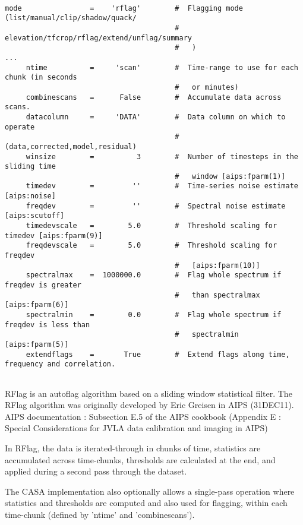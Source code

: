 \small
\begin{verbatim}

mode                =    'rflag'        #  Flagging mode (list/manual/clip/shadow/quack/
                                        #   elevation/tfcrop/rflag/extend/unflag/summary
                                        #   )
...
     ntime          =     'scan'        #  Time-range to use for each chunk (in seconds
                                        #   or minutes)
     combinescans   =      False        #  Accumulate data across scans.
     datacolumn     =     'DATA'        #  Data column on which to operate
                                        #   (data,corrected,model,residual)
     winsize        =          3        #  Number of timesteps in the sliding time
                                        #   window [aips:fparm(1)]
     timedev        =         ''        #  Time-series noise estimate [aips:noise]
     freqdev        =         ''        #  Spectral noise estimate [aips:scutoff]
     timedevscale   =        5.0        #  Threshold scaling for timedev [aips:fparm(9)]
     freqdevscale   =        5.0        #  Threshold scaling for freqdev
                                        #   [aips:fparm(10)]
     spectralmax    =  1000000.0        #  Flag whole spectrum if freqdev is greater
                                        #   than spectralmax [aips:fparm(6)]
     spectralmin    =        0.0        #  Flag whole spectrum if freqdev is less than
                                        #   spectralmin [aips:fparm(5)]
     extendflags    =       True        #  Extend flags along time, frequency and correlation.
                                       
\end{verbatim}
\normalsize

RFlag is an autoflag algorithm based on a sliding window statistical
filter. The RFlag algorithm was originally developed by Eric Greisen
in AIPS (31DEC11).  AIPS documentation : Subsection E.5 of the AIPS
cookbook (Appendix E : Special Considerations for JVLA data
calibration and imaging in AIPS)

In RFlag, the data is iterated-through in chunks of time, statistics
are accumulated across time-chunks, thresholds are calculated at the
end, and applied during a second pass through the dataset.

The CASA implementation also optionally allows a single-pass operation
where statistics and thresholds are computed and also used for
flagging, within each time-chunk (defined by 'ntime' and
'combinescans').

